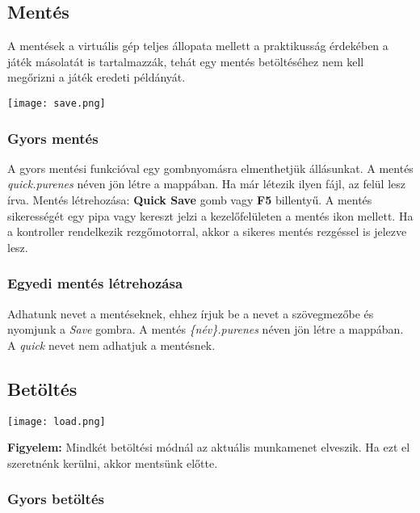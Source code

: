 \subsection{Mentés}

A mentések a virtuális gép teljes állopata mellett a praktikusság érdekében a játék másolatát is tartalmazzák, tehát egy mentés betöltéséhez nem kell megőrizni a játék eredeti példányát.

\begin{center}
	\texttt{[image: save.png]}
\end{center}

\subsubsection{Gyors mentés}

A gyors mentési funkcióval egy gombnyomásra elmenthetjük állásunkat. A mentés \emph{quick.purenes} néven jön létre a mappában. Ha már létezik ilyen fájl, az felül lesz írva.
Mentés létrehozása: \textbf{Quick Save} gomb vagy \textbf{F5} billentyű.
A mentés sikerességét egy pipa vagy kereszt jelzi a kezelőfelületen a mentés ikon mellett.
Ha a kontroller rendelkezik rezgőmotorral, akkor a sikeres mentés rezgéssel is jelezve lesz.

\subsubsection{Egyedi mentés létrehozása}

Adhatunk nevet a mentéseknek, ehhez írjuk be a nevet a szövegmezőbe és nyomjunk a \emph{Save} gombra. A mentés \emph{\{név\}.purenes} néven jön létre a mappában. A \emph{quick} nevet nem adhatjuk a mentésnek.

\subsection{Betöltés}

\begin{center}
	\texttt{[image: load.png]}
\end{center}

\textbf{Figyelem:} Mindkét betöltési módnál az aktuális munkamenet elveszik. Ha ezt el szeretnénk kerülni, akkor mentsünk előtte.

\subsubsection{Gyors betöltés}

